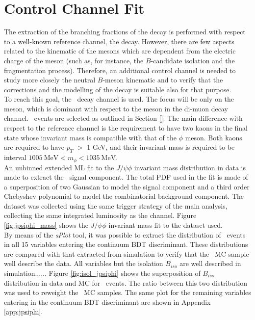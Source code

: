 \section{Control Channel Fit}
\label{sec:ControlChannel}

The extraction of the branching fractions of the \Bmumu decay is performed with respect to a well-known reference channel, the \BpmKpmJpsi decay. However, there are few aspects related to the kinematic of the \Bds mesons which are dependent from the electric charge of the meson (such as, for instance, the $B$-candidate isolation and the fragmentation process). Therefore, an additional control channel is needed to study more closely the neutral $B$-meson kinematic and to verify that the corrections and the modelling of the \BpmKpmJpsi decay is suitable also for that purpose.\\
To reach this goal, the \BsJpsiPhi\ decay channel is used. The focus will be only on the \Bs meson, which is dominant with respect to the \Bd meson in the di-muon decay channel. 
\BsJpsiPhi\ events are selected as outlined in Section \ref{}. The main difference with respect to the reference channel is the requirement to have two kaons in the final state whose invariant mass is compatible with that of the $\phi$ meson. Both kaons are required to have $p_T$ $>$ 1 GeV, and their invariant mass is required to be interval $1005 \ \text{MeV} < m_\phi < 1035 \ \text{MeV}$. \\
An unbinned extended ML fit to the $J/\psi \phi$ invariant mass distribution in data is made to extract the \BsJpsiPhi\ signal component. The total PDF used in the fit is made of a superposition of two Gaussian to model the signal component and a third order Chebyshev polynomial to model the combinatorial background component. The dataset was collected using the same trigger strategy of the main analysis, collecting the same integrated luminosity as the \BpmKpmJpsi channel. Figure \ref{fig:jpsiphi_mass} shows the $J/\psi \phi$ invariant mass fit to the dataset used. \\
By means of the \textit{sPlot} tool, it was possible to extract the distribution of \BsJpsiPhi\ events in all 15 variables entering the continuum BDT discriminant. These distributions are compared with that extracted from simulation to verify that the \BsJpsiPhi\ MC sample well describe the data. All variables but the isolation $B_{iso}$ are well described in simulation...... Figure \ref{fig:isol_jpsiphi} shows the superposition of $B_{iso}$ distribution in data and MC for \BsJpsiPhi\ events. The ratio between this two distribution was used to reweight the \Bsmumu\ MC samples. The same plot for the remaining variables entering in the continuum BDT discriminant are shown in Appendix \ref{app:jpsiphi}.

